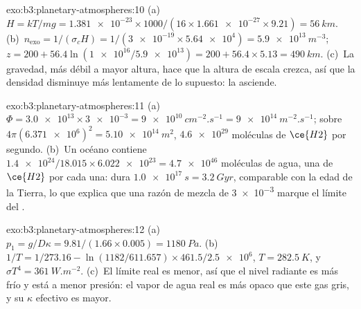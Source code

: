\begin{solution}{exo:b3:planetary-atmospheres:10}
(a)~$H = kT/mg = \num{1.381e-23}\times1000/(16\times\num{1.661e-27}\times9.21)
= \qty{56}{km}$. (b)~$n_\mathrm{exo} = 1/(\sigma_c H) = 1/(\num{3e-19}\times
\num{5.64e4}) = \qty{5.9e13}{m^{-3}}$; $z = 200 + 56.4\ln(\num{1e16}/
\num{5.9e13}) = 200 + 56.4\times5.13 = \qty{490}{km}$. (c)~La gravedad, más débil
a mayor altura, hace que la altura de escala crezca, así que la densidad
disminuye más lentamente de lo supuesto: la  asciende.
\end{solution}

\begin{solution}{exo:b3:planetary-atmospheres:11}
(a)~$\Phi = \num{3.0e13}\times\num{3e-3} = \qty{9e10}{cm^{-2}.s^{-1}} =
\qty{9e14}{m^{-2}.s^{-1}}$; sobre $4\pi(\num{6.371e6})^2 =
\qty{5.10e14}{m^2}$, $\num{4.6e29}$ moléculas de $\ce{H2}$ por segundo.
(b)~Un océano contiene $\num{1.4e24}/18.015\times\num{6.022e23} =
\num{4.7e46}$ moléculas de agua, una de $\ce{H2}$ por cada una: dura
$\qty{1.0e17}{s} = \qty{3.2}{Gyr}$, comparable con la edad de
la Tierra, lo que explica que una razón de mezcla de \num{3e-3} marque el
límite del .
\end{solution}

\begin{solution}{exo:b3:planetary-atmospheres:12}
(a)~$p_1 = g/D\kappa = 9.81/(1.66\times0.005) = \qty{1180}{Pa}$.
(b)~$1/T = 1/273.16 - \ln(1182/611.657)\times461.5/\num{2.5e6}$, $T =
\qty{282.5}{K}$, y $\sigma T^4 = \qty{361}{W.m^{-2}}$. (c)~El límite real
es menor, así que el nivel radiante es más frío y está a menor presión: el
vapor de agua real es más opaco que este gas gris, y su $\kappa$ efectivo
es mayor.
\end{solution}

